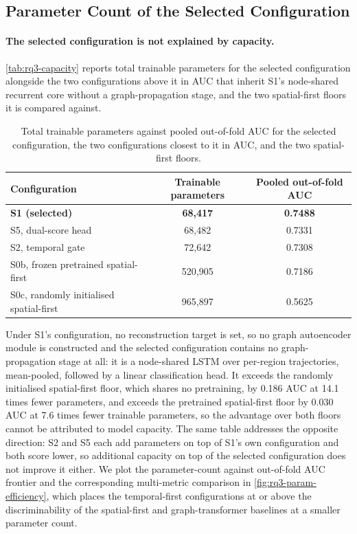 \subsection{Parameter Count of the Selected Configuration}\label{sec:rq3-capacity}

\paragraph{The selected configuration is not explained by capacity.}
\autoref{tab:rq3-capacity} reports total trainable parameters for the selected configuration
alongside the two configurations above it in \ac{AUC} that inherit S1's node-shared recurrent core
without a graph-propagation stage, and the two spatial-first floors it is compared against.

\begin{table}[htbp]
\centering
\caption{Total trainable parameters against pooled out-of-fold \ac{AUC} for the selected
  configuration, the two configurations closest to it in \ac{AUC}, and the two spatial-first floors.}
\label{tab:rq3-capacity}
\begin{tabular}{@{}lcc@{}}
\toprule
Configuration & Trainable parameters & Pooled out-of-fold \ac{AUC} \\
\midrule
\textbf{S1 (selected)} & \textbf{68{,}417} & \textbf{0.7488} \\
S5, dual-score head & 68{,}482 & 0.7331 \\
S2, temporal gate & 72{,}642 & 0.7308 \\
S0b, frozen pretrained spatial-first & 520{,}905 & 0.7186 \\
S0c, randomly initialised spatial-first & 965{,}897 & 0.5625 \\
\bottomrule
\end{tabular}
\end{table}

Under S1's configuration, no reconstruction target is set, so no graph autoencoder module is
constructed and the selected configuration contains no graph-propagation stage at all: it is
a node-shared \ac{LSTM} over per-region trajectories, mean-pooled, followed by a linear
classification head. It exceeds the randomly initialised spatial-first floor, which shares
no pretraining, by 0.186 \ac{AUC} at 14.1 times fewer parameters, and exceeds the pretrained
spatial-first floor by 0.030 \ac{AUC} at 7.6 times fewer trainable parameters, so the
advantage over both floors cannot be attributed to model capacity. The same table addresses the opposite direction: S2 and S5 each add parameters on top of S1's own configuration and both score lower, so additional capacity on top of the selected configuration does not improve it either. We plot the parameter-count against out-of-fold \ac{AUC} frontier and the corresponding multi-metric comparison in \autoref{fig:rq3-param-efficiency}, which places the temporal-first configurations at or above the discriminability of the spatial-first and graph-transformer baselines at a smaller parameter count.

